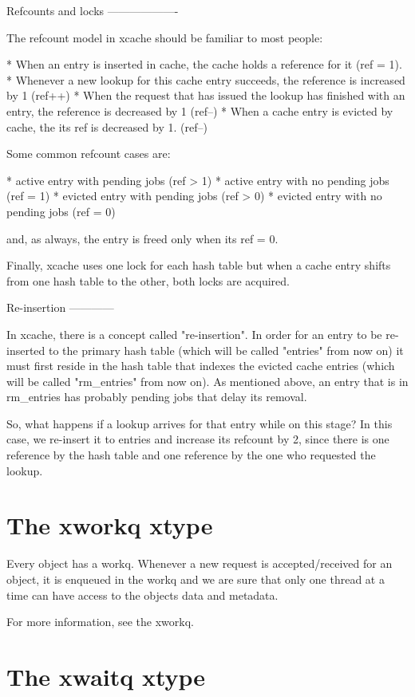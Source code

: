 Refcounts and locks
-------------------

The refcount model in xcache should be familiar to most people:

* When an entry is inserted in cache, the cache holds a reference for it (ref =
  1).
* Whenever a new lookup for this cache entry succeeds, the reference is
  increased by 1 (ref++)
* When the request that has issued the lookup has finished with an entry, the
  reference is decreased by 1 (ref--)
* When a cache entry is evicted by cache, the its ref is decreased by 1.
  (ref--)

Some common refcount cases are:

* active entry with pending jobs (ref > 1)
* active entry with no pending jobs (ref = 1)
* evicted entry with pending jobs (ref > 0)
* evicted entry with no pending jobs (ref = 0)

and, as always, the entry is freed only when its ref = 0.

Finally, xcache uses one lock for each hash table but when a cache entry shifts
from one hash table to the other, both locks are acquired.

Re-insertion
------------

In xcache, there is a concept called "re-insertion". In order for an entry to
be re-inserted to the primary hash table (which will be called "entries" from
now on) it must first reside in the hash table that indexes the evicted cache
entries (which will be called "rm\_entries" from now on). As mentioned above,
an entry that is in rm\_entries has probably pending jobs that delay its
removal.

So, what happens if a lookup arrives for that entry while on this stage? In
this case, we re-insert it to entries and increase its refcount by 2, since
there is one reference by the hash table and one reference by the one who
requested the lookup.


\section{The xworkq xtype}

Every object has a workq. Whenever a new request is accepted/received for an
object, it is enqueued in the workq and we are sure that only one thread at a
time can have access to the objects data and metadata.

For more information, see the xworkq.

\section{The xwaitq xtype}

